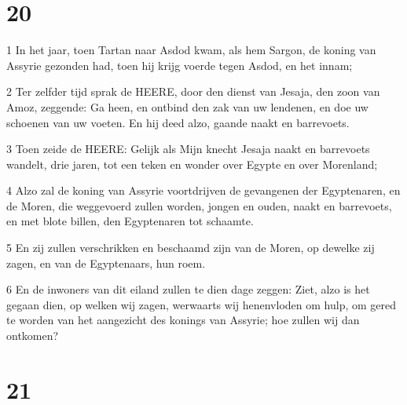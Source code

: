 \chapter{20}

\par 1 In het jaar, toen Tartan naar Asdod kwam, als hem Sargon, de koning van Assyrie gezonden had, toen hij krijg voerde tegen Asdod, en het innam;
\par 2 Ter zelfder tijd sprak de HEERE, door den dienst van Jesaja, den zoon van Amoz, zeggende: Ga heen, en ontbind den zak van uw lendenen, en doe uw schoenen van uw voeten. En hij deed alzo, gaande naakt en barrevoets.
\par 3 Toen zeide de HEERE: Gelijk als Mijn knecht Jesaja naakt en barrevoets wandelt, drie jaren, tot een teken en wonder over Egypte en over Morenland;
\par 4 Alzo zal de koning van Assyrie voortdrijven de gevangenen der Egyptenaren, en de Moren, die weggevoerd zullen worden, jongen en ouden, naakt en barrevoets, en met blote billen, den Egyptenaren tot schaamte.
\par 5 En zij zullen verschrikken en beschaamd zijn van de Moren, op dewelke zij zagen, en van de Egyptenaars, hun roem.
\par 6 En de inwoners van dit eiland zullen te dien dage zeggen: Ziet, alzo is het gegaan dien, op welken wij zagen, werwaarts wij henenvloden om hulp, om gered te worden van het aangezicht des konings van Assyrie; hoe zullen wij dan ontkomen?

\chapter{21}

